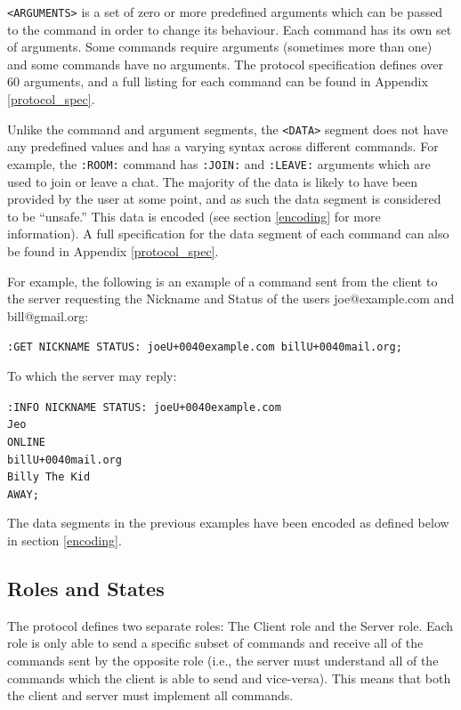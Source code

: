 \texttt{<ARGUMENTS>} is a set of zero or more predefined arguments which can be passed to the command in order to change its behaviour. Each command has its own set of arguments. Some commands require arguments (sometimes more than one) and some commands have no arguments. The protocol specification defines over 60 arguments, and a full listing for each command can be found in Appendix \ref{protocol_spec}.

Unlike the command and argument segments, the \texttt{<DATA>} segment does not have any predefined values and has a varying syntax across different commands.  For example, the \texttt{:ROOM:} command has \texttt{:JOIN:} and \texttt{:LEAVE:} arguments which are used to join or leave a chat. The majority of the data is likely to have been provided by the user at some point, and as such the data segment is considered to be ``unsafe.'' This data is encoded (see section \ref{encoding} for more information). A full specification for the data segment of each command can also be found in Appendix \ref{protocol_spec}.

For example, the following is an example of a command sent from the client to the server requesting the Nickname and Status of the users joe@example.com and bill@gmail.org:

\texttt{:GET NICKNAME STATUS: joe\SLASH U+0040example.com bill\SLASH U+0040mail.org;}

To which the server may reply:

\texttt{:INFO NICKNAME STATUS: joe\SLASH U+0040example.com\\
Jeo\\
ONLINE\\
bill\SLASH U+0040mail.org\\
Billy The Kid\\
AWAY;}

The data segments in the previous examples have been encoded as defined below in section \ref{encoding}.

\subsection{Roles and States}

The protocol defines two separate roles: The Client role and the Server role. Each role is only able to send a specific subset of commands and receive all of the commands sent by the opposite role (i.e., the server must understand all of the commands which the client is able to send and vice-versa). This means that both the client and server must implement all commands.

